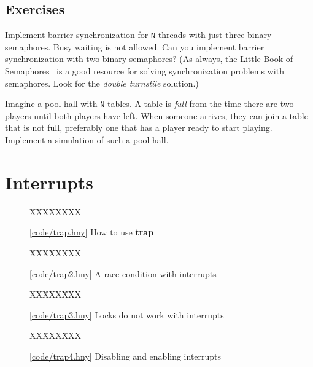 \documentclass{report}
\newcommand{\harmonysource}[1]{
\begin{tabbing}
XX\=XXX\=XXX\kill
    
\end{tabbing}
}
\newcommand{\harmonylink}[1]{%
[\href{https://harmony.cs.cornell.edu/#1}{\underline{#1}}]%
}
\newenvironment{code}{
\tcolorbox
}{
\endtcolorbox
}
\begin{document}
\section*{Exercises}
\begin{problems}
\item Implement barrier synchronization for \texttt{N} threads
with just three binary semaphores.  Busy waiting is not allowed.
Can you implement barrier synchronization with two binary semaphores?
(As always, the Little Book of Semaphores~\cite{Downey09} is a good resource
for solving synchronization problems with semaphores.
Look for the \emph{double turnstile}
%
solution.)
\item Imagine a pool hall with \texttt{N} tables.  A table is \emph{full}
from the time there are two players until both players have left.
When someone arrives, they can join a table that is not full, preferably
one that has a player ready to start playing.
Implement a simulation of such a pool hall.
\end{problems}

\chapter{Interrupts}
\label{ch:interrupts}

\begin{figure}
\begin{code}
\harmonysource{trap}
\end{code}
\caption{\harmonylink{code/trap.hny} How to use \textbf{trap}}
\label{fig:trap}
\end{figure}

\begin{figure}
\begin{code}
\harmonysource{trap2}
\end{code}
\caption{\harmonylink{code/trap2.hny} A race condition with interrupts}
\label{fig:trap2}
\end{figure}

\begin{figure}
\begin{code}
\harmonysource{trap3}
\end{code}
\caption{\harmonylink{code/trap3.hny} Locks do not work with interrupts}
\label{fig:trap3}
\end{figure}

\begin{figure}
\begin{code}
\harmonysource{trap4}
\end{code}
\caption{\harmonylink{code/trap4.hny} Disabling and enabling interrupts}
\label{fig:trap4}
\end{figure}
\end{document}
